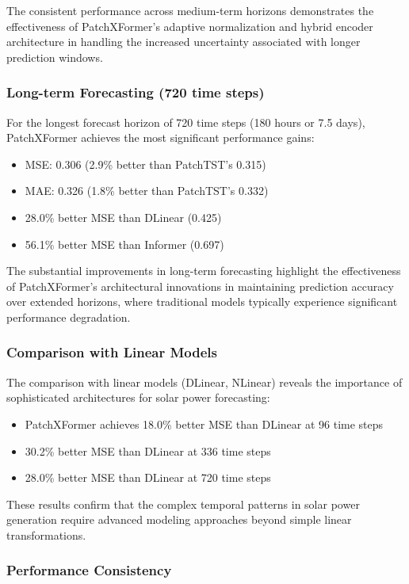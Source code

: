 \documentclass[12pt]{uomthesis}
\begin{document}
The consistent performance across medium-term horizons demonstrates the effectiveness of PatchXFormer's adaptive normalization and hybrid encoder architecture in handling the increased uncertainty associated with longer prediction windows.

\subsubsection{Long-term Forecasting (720 time steps)}

For the longest forecast horizon of 720 time steps (180 hours or 7.5 days), PatchXFormer achieves the most significant performance gains:
\begin{itemize}
\item MSE: 0.306 (2.9\% better than PatchTST's 0.315)
\item MAE: 0.326 (1.8\% better than PatchTST's 0.332)
\item 28.0\% better MSE than DLinear (0.425)
\item 56.1\% better MSE than Informer (0.697)
\end{itemize}

The substantial improvements in long-term forecasting highlight the effectiveness of PatchXFormer's architectural innovations in maintaining prediction accuracy over extended horizons, where traditional models typically experience significant performance degradation.

\subsubsection{Comparison with Linear Models}

The comparison with linear models (DLinear, NLinear) reveals the importance of sophisticated architectures for solar power forecasting:
\begin{itemize}
\item PatchXFormer achieves 18.0\% better MSE than DLinear at 96 time steps
\item 30.2\% better MSE than DLinear at 336 time steps
\item 28.0\% better MSE than DLinear at 720 time steps
\end{itemize}

These results confirm that the complex temporal patterns in solar power generation require advanced modeling approaches beyond simple linear transformations.

\subsubsection{Performance Consistency}
\end{document}
